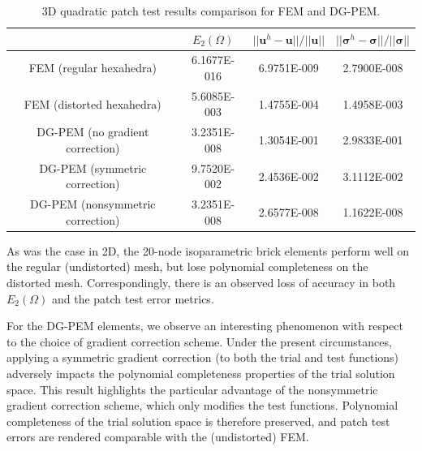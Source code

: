 \begin{table}[!ht]
  \begin{center}
    \begin{tabular}{| c || c | c | c |}
    \hline
           & $E_2 (\Omega)$ & $||\mathbf{u}^h - \mathbf{u}|| / ||\mathbf{u}||$ & $||\boldsymbol{\sigma}^h - \boldsymbol{\sigma}|| / ||\boldsymbol{\sigma}||$ \\ \hline \hline
    FEM (regular hexahedra) & 6.1677E-016 & 6.9751E-009 & 2.7900E-008 \\ \hline
    FEM (distorted hexahedra) & 5.6085E-003 & 1.4755E-004 & 1.4958E-003 \\ \hline
    DG-PEM (no gradient correction) & 3.2351E-008 & 1.3054E-001 & 2.9833E-001 \\ \hline
    DG-PEM (symmetric correction) & 9.7520E-002 & 2.4536E-002 & 3.1112E-002 \\ \hline
    DG-PEM (nonsymmetric correction) & 3.2351E-008 & 2.6577E-008 & 1.1622E-008 \\
    \hline
    \end{tabular}
    \caption{3D quadratic patch test results comparison for FEM and DG-PEM.}
    \vspace{-5pt}
    \label{tab:quadratic_patch_test_3d}
    \vspace{-25pt}
  \end{center}
\end{table}

As was the case in 2D, the 20-node isoparametric brick elements perform well on the regular (undistorted) mesh, but lose polynomial completeness on the distorted mesh. Correspondingly, there is an observed loss of accuracy in both $E_2 (\Omega)$ and the patch test error metrics.

For the DG-PEM elements, we observe an interesting phenomenon with respect to the choice of gradient correction scheme. Under the present circumstances, applying a symmetric gradient correction (to both the trial and test functions) adversely impacts the polynomial completeness properties of the trial solution space. This result highlights the particular advantage of the nonsymmetric gradient correction scheme, which only modifies the test functions. Polynomial completeness of the trial solution space is therefore preserved, and patch test errors are rendered comparable with the (undistorted) FEM.

